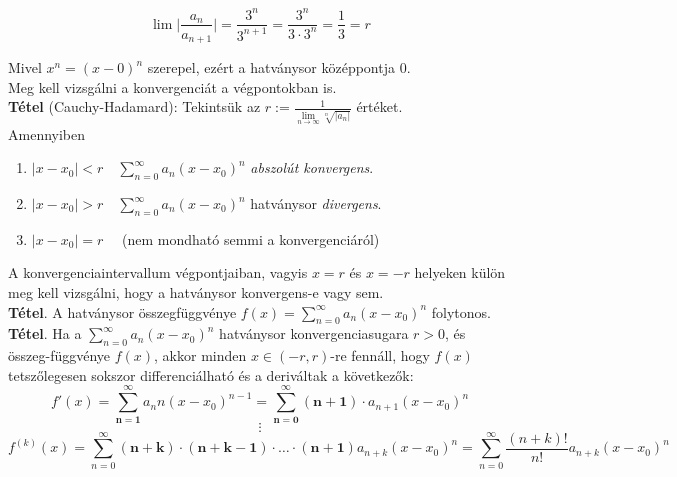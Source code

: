 \documentclass[tikz,12pt,margin=0px]{article}
\newcommand\ddfrac[2]{\frac{\displaystyle #1}{\displaystyle #2}}
\begin{document}
    \[
        \lim\limits_{}^{}\Big|\ddfrac{a_{n}}{a_{n+1}}\Big| = \ddfrac{3^{n}}{3^{n+1}} = \ddfrac{3^{n}}{3 \cdot 3^{n}} = \ddfrac{1}{3} = r
    \]

    \noindent Mivel $x^n = (x - 0)^{n}$ szerepel, ezért a hatványsor középpontja 0.\\

    \noindent Meg kell vizsgálni a konvergenciát a végpontokban is.\\

    \noindent \textbf{Tétel} (Cauchy-Hadamard): Tekintsük az $r := \ddfrac{1}{\lim\limits_{n \to \infty}^{}\sqrt[n]{|a_{n}|}}$ értéket.\\

    \noindent Amennyiben
    \begin{enumerate}
        \item $|x - x_{0}| < r \quad \sum\limits_{n=0}^{\infty}a_{n}(x-x_{0})^{n}$ \emph{abszolút konvergens}.
        \item $|x - x_{0}| > r \quad \sum\limits_{n=0}^{\infty}a_{n}(x-x_{0})^{n}$ hatványsor \emph{divergens}.
        \item $|x - x_{0}| = r \quad$ (nem mondható semmi a konvergenciáról)
    \end{enumerate}

    \noindent A konvergenciaintervallum végpontjaiban, vagyis $x=r$ és $x=- r$ helyeken külön meg kell vizsgálni, hogy a hatványsor konvergens-e vagy sem.\\

    \noindent \textbf{Tétel}. A hatványsor összegfüggvénye $f(x) = \sum\limits_{n=0}^{\infty}a_{n}(x-x_{0})^{n}$ folytonos. \\

    \noindent \textbf{Tétel}. Ha a $\sum\limits_{n=0}^{\infty}a_{n}(x - x_{0})^{n}$ hatványsor konvergenciasugara $r > 0$, és összeg-függvénye $f(x)$, akkor minden $x \in (- r,r)$-re fennáll, hogy $f(x)$ tetszőlegesen sokszor differenciálható és a deriváltak a következők:
    \[
        f'(x) =\sum\limits_{\boldsymbol{n=1}}^{\infty} a_{n}n(x - x_0)^{n-1} = \sum\limits_{\boldsymbol{n=0}}^{\infty}\boldsymbol{(n+1)} \cdot a_{n+1}(x-x_{0})^{n}
    \]
    \[
        \vdots
    \]
    \[
        f^{(k)}(x) = \sum\limits_{n=0}^{\infty}\boldsymbol{(n+k)} \cdot \boldsymbol{(n+k-1)} \cdot \ldots \cdot \boldsymbol{(n+1)} a_{n+k}(x-x_{0})^{n} = \sum\limits_{n=0}^{\infty} \ddfrac{(n+k)!}{n!} a_{n+k}(x-x_{0})^{n}
    \]
	
\end{document}
